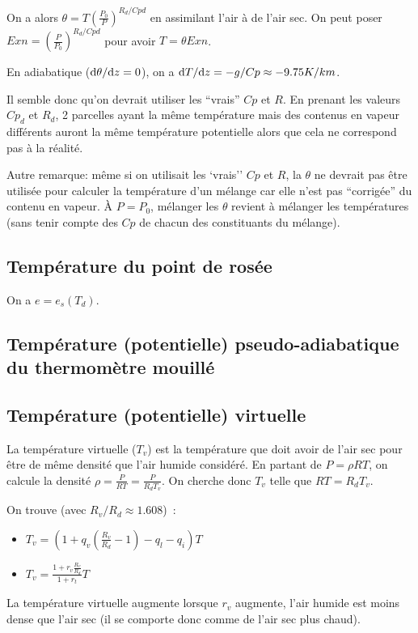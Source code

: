 \documentclass{article}
\begin{document}
On a alors $\theta=T(\frac{P_0}{P})^{R_d/Cpd}$ en assimilant l'air à de l'air sec.
On peut poser $Exn=(\frac{P}{P_0})^{R_d/Cpd}$ pour avoir $T=\theta Exn$.

En adiabatique (${\rm d}\theta/{\rm d}z=0$), on a ${\rm d}T/{\rm d}z=-g/Cp\approx-9.75K/km$.

Il semble donc qu'on devrait utiliser les ``vrais'' $Cp$ et $R$. En prenant les valeurs $Cp_d$ et $R_d$, 2 parcelles ayant la même température mais des contenus en vapeur différents auront la même température potentielle alors que cela ne correspond pas à la réalité.

Autre remarque: même si on utilisait les `vrais'' $Cp$ et $R$, la $\theta$ ne devrait pas être utilisée pour calculer la température d'un mélange car elle n'est pas ``corrigée'' du contenu en vapeur. À $P=P_0$, mélanger les $\theta$ revient à mélanger les températures (sans tenir compte des $Cp$ de chacun des constituants du mélange).

\subsection{Température du point de rosée}
\label{Td}
On a $e=e_s(T_d)$.

\subsection{Température (potentielle) pseudo-adiabatique du thermomètre mouillé}
\label{theta_prime_w}

\subsection{Température (potentielle) virtuelle}
\label{theta_v}
La température virtuelle ($T_v$) est la température que doit avoir de l'air sec pour être de même densité que l'air humide considéré. En partant de $P=\rho R T$, on calcule la densité $\rho = \frac{P}{R T} = \frac{P}{R_d T_v}$. On cherche donc $T_v$ telle que $R T = R_d T_v$.

On trouve (avec $R_v / R_d \approx 1.608$)~:
\begin{itemize}
  \item {\color{red}$T_v = (1 + q_v (\frac{R_v}{R_d} - 1) -q_l -q_i) T$}
  \item {\color{red}$T_v = \frac{1 + r_v \frac{R_v}{R_d}}{1 + r_t} T$}
\end{itemize}

La température virtuelle augmente lorsque $r_v$ augmente, l'air humide est moins dense que l'air sec (il se comporte donc comme de l'air sec plus chaud).
\end{document}

